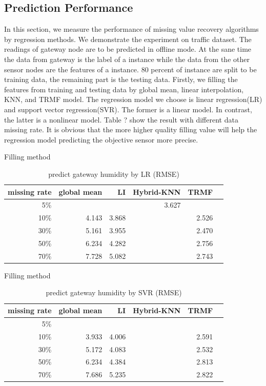 \subsection{Prediction Performance}
In this section, we measure the performance of missing value recovery algorithms by regression methods.
We demonstrate the experiment on traffic dataset.
The readings of gateway node are to be predicted in offline mode.
At the sane time the data from gateway is the label of a instance while the data from the other sensor nodes are the features of a instance.
80 percent of instance are split to be training data, the remaining part is the testing data.
Firstly, we filling the features from training and testing data by global mean, linear interpolation, KNN, and TRMF model.
The regression model we choose is linear regression(LR) and support vector regression(SVR).
The former is a linear model.
In contrast, the latter is a nonlinear model.
Table ? show the result with different data missing rate.
It is obvious that the more higher quality filling value will help the regression model predicting the objective sensor more precise.

\begin{table} [htbp]
\centering
\caption{predict gateway humidity by LR (RMSE) }
\label{table: LR}
   Filling method
\begin{tabular}{ r | r r r r r}
        missing rate&global mean     &LI   &Hybrid-KNN &TRMF\\ \hline
        5\%      &&&3.627&\\
        10\%    &4.143&3.868&&2.526\\
        30\%    &5.161&3.955&&2.470\\
        50\%    &6.234&4.282&&2.756\\
        70\%   &7.728&5.082&&2.743
\end{tabular}
\end{table}

\begin{table}[htbp]
\centering
\caption{predict gateway humidity by SVR (RMSE) }
\label{table: SVR}
   Filling method
\begin{tabular}{ r | r r r r r}
        missing rate&global mean     &LI   &Hybrid-KNN &TRMF\\ \hline
        5\%\\
        10\%    &3.933 &4.006&&2.591\\
        30\%    &5.172&4.083&&2.532\\
        50\%    &6.234&4.384&&2.813\\
        70\%   &7.686&5.235&&2.822
\end{tabular}
\end{table}
